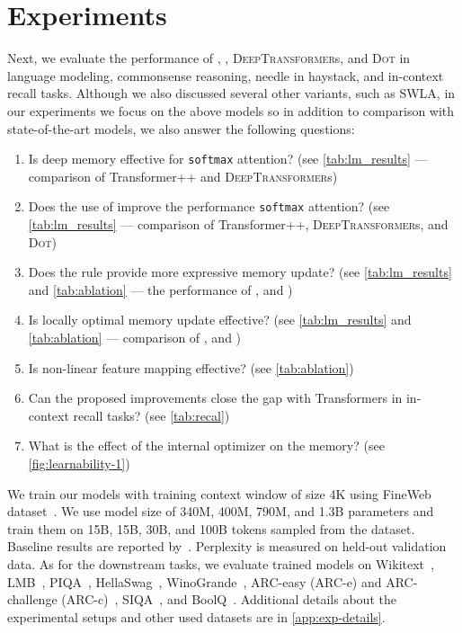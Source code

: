 \section{Experiments}\label{sec:experiments}
Next, we evaluate the performance of \model, \omodel, \textsc{DeepTransformer}s, and \textsc{Dot} in language modeling, commonsense reasoning, needle in haystack, and in-context recall tasks. Although we also discussed several other variants, such as SWLA, in our experiments we focus on the above models so in addition to comparison with state-of-the-art models, we also answer the following questions: 
\begin{enumerate}
    \item Is deep memory effective for \texttt{softmax} attention? (see \autoref{tab:lm_results} — comparison of Transformer++ and \textsc{DeepTransformer}s)
    \item Does the use of \learningrule{} improve the performance \texttt{softmax} attention? (see \autoref{tab:lm_results} — comparison of Transformer++, \textsc{DeepTransformer}s, and \textsc{Dot})
    \item Does the \learningrule{} rule provide more expressive memory update? (see \autoref{tab:lm_results} and \autoref{tab:ablation} — the performance of \omodel, and \model)
    \item Is locally optimal memory update effective? (see \autoref{tab:lm_results} and \autoref{tab:ablation} — comparison of \omodel, and \model)
    \item Is non-linear feature mapping effective? (see \autoref{tab:ablation})
    \item Can the proposed improvements close the gap with Transformers in in-context recall tasks? (see \autoref{tab:recal})
    \item What is the effect of the internal optimizer on the memory? (see \autoref{fig:learnability-1})
\end{enumerate}



  We train our models with training context window of size 4K using FineWeb dataset~\citep{penedo2024fineweb}. We use model size of 340M, 400M, 790M, and 1.3B parameters and train them on 15B, 15B, 30B, and 100B tokens sampled from the dataset. Baseline results are reported
by~\citet{yang2024gated, behrouz2024titans, behrouz2025Miras}. Perplexity is measured on held-out validation data. As for the downstream tasks, we evaluate trained models on Wikitext~\citep{merity2017pointer}, LMB~\citep{paperno-etal-2016-lambada}, PIQA~\citep{bisk2020piqa}, HellaSwag~\citep{zellers-etal-2019-hellaswag}, WinoGrande~\citep{sakaguchi2021winogrande},  ARC-easy (ARC-e) and ARC-challenge (ARC-c)~\citep{clark2018think}, SIQA~\citep{sap-etal-2019-social}, and BoolQ~\citep{clark-etal-2019-boolq}. Additional details about the experimental setups and other used datasets are in \autoref{app:exp-details}. 







